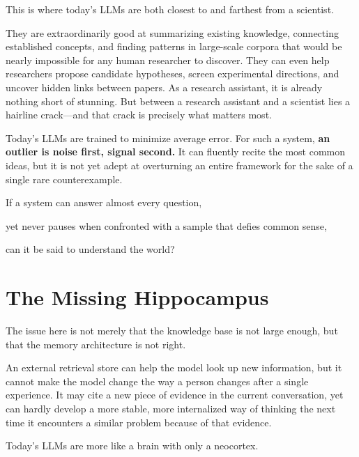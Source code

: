 \vspace{1em}

This is where today's LLMs are both closest to and farthest from a scientist.

They are extraordinarily good at summarizing existing knowledge, connecting established concepts, and finding patterns in large-scale corpora that would be nearly impossible for any human researcher to discover. They can even help researchers propose candidate hypotheses, screen experimental directions, and uncover hidden links between papers. As a research assistant, it is already nothing short of stunning.
But between a research assistant and a scientist lies a hairline crack---and that crack is precisely what matters most.

\vspace{1em}

Today's LLMs are trained to minimize average error.
For such a system, \textbf{an outlier is noise first, signal second.} It can fluently recite the most common ideas, but it is not yet adept at overturning an entire framework for the sake of a single rare counterexample.

\begin{thinkbox}
If a system can answer almost every question,

yet never pauses when confronted with a sample that defies common sense,

can it be said to understand the world?
\end{thinkbox}

\vspace{1em}

\newpage
\section{The Missing Hippocampus}

The issue here is not merely that the knowledge base is not large enough, but that the memory architecture is not right.

An external retrieval store can help the model look up new information, but it cannot make the model change the way a person changes after a single experience. It may cite a new piece of evidence in the current conversation, yet can hardly develop a more stable, more internalized way of thinking the next time it encounters a similar problem because of that evidence.

\vspace{1em}

Today's LLMs are more like a brain with only a neocortex.

